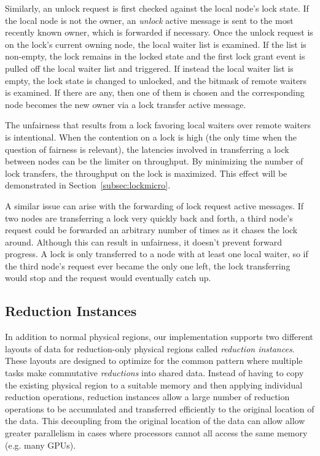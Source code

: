 Similarly, an unlock request is first checked against the local node's lock state.  If the local node is
not the owner, an {\em unlock} active message is sent to the most recently known owner, which is forwarded
if necessary.  Once the unlock request is on the lock's current owning node, the local waiter list is
examined.  If the list is non-empty, the lock remains in the locked state and the first lock grant
event is pulled off the local waiter list and triggered.  If instead the local waiter list is empty, the
lock state is changed to unlocked, and the bitmask of remote waiters is examined.  If there are any, then
one of them is chosen and the corresponding node becomes the new owner via a lock transfer active message.

The unfairness that results from a lock favoring local waiters over remote waiters is intentional.  When the
contention on a lock is high (the only time when the question of fairness is relevant), the latencies
involved in transferring a lock between nodes can be the limiter on throughput.  By minimizing the number
of lock transfers, the throughput on the lock is maximized.  This effect will be demonstrated in
Section~\ref{subsec:lockmicro}.

A similar issue can arise with the forwarding of lock request active messages.  If two nodes are
transferring a lock very quickly back and forth, a third node's request could be forwarded an arbitrary
number of times as it chases the lock around.  Although this can result in unfairness, it doesn't 
prevent forward progress.  A lock is only transferred to a node with at least one local waiter, so if 
the third node's request ever became the only one left, the lock transferring would stop and the request
would eventually catch up.

\subsection{Reduction Instances}
\label{subsec:reducimpl}

In addition to normal physical regions, our implementation supports two different layouts of data for
reduction-only physical regions called {\em reduction instances}.   
These layouts are designed to optimize for the common pattern where 
multiple tasks make commutative {\em reductions} into shared data.  Instead of having to copy the existing 
physical region to a suitable memory and then applying individual reduction operations, reduction instances 
allow a large number of reduction operations to be accumulated and transferred efficiently to the original 
location of the data. This decoupling from the original location of the data can allow allow greater parallelism
in cases where processors cannot all access the same memory (e.g. many GPUs).

